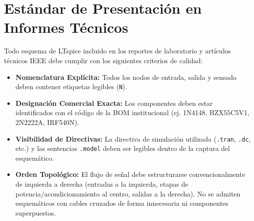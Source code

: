 \documentclass[11pt, a4paper]{article}
\begin{document}
\section{Estándar de Presentación en Informes Técnicos}
Todo esquema de LTspice incluido en los reportes de laboratorio y artículos técnicos IEEE debe cumplir con los siguientes criterios de calidad:
\begin{itemize}
    \item \textbf{Nomenclatura Explícita:} Todos los nodos de entrada, salida y sensado deben contener etiquetas legibles (\texttt{N}).
    \item \textbf{Designación Comercial Exacta:} Los componentes deben estar identificados con el código de la BOM institucional (ej. 1N4148, BZX55C5V1, 2N2222A, IRF540N).
    \item \textbf{Visibilidad de Directivas:} La directiva de simulación utilizada (\texttt{.tran}, \texttt{.dc}, etc.) y las sentencias \texttt{.model} deben ser legibles dentro de la captura del esquemático.
    \item \textbf{Orden Topológico:} El flujo de señal debe estructurarse convencionalmente de izquierda a derecha (entradas a la izquierda, etapas de potencia/acondicionamiento al centro, salidas a la derecha). No se admiten esquemáticos con cables cruzados de forma innecesaria ni componentes superpuestos.
\end{itemize}
\end{document}
